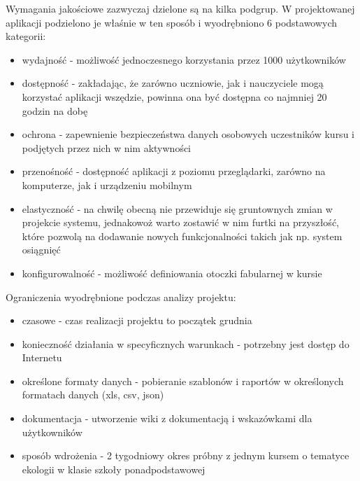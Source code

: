 Wymagania jakościowe zazwyczaj dzielone są na kilka podgrup. W projektowanej aplikacji podzielono je właśnie w ten sposób i wyodrębniono 6 podstawowych kategorii:
\begin{itemize}
\item wydajność - możliwość jednoczesnego korzystania przez 1000 użytkowników
\item dostępność - zakładając, że zarówno uczniowie, jak i nauczyciele mogą korzystać aplikacji wszędzie, powinna ona być dostępna co najmniej 20 godzin na dobę
\item ochrona - zapewnienie bezpieczeństwa danych osobowych uczestników kursu i podjętych przez nich w nim aktywności 
\item przenośność - dostępność aplikacji z poziomu przeglądarki, zarówno na komputerze, jak i urządzeniu mobilnym
\item elastyczność - na chwilę obecną nie przewiduje się gruntownych zmian w projekcie systemu, jednakowoż warto zostawić w nim furtki na przyszłość, które pozwolą na dodawanie nowych funkcjonalności takich jak np. system osiągnięć 
\item konfigurowalność - możliwość definiowania otoczki fabularnej w kursie
\end{itemize} 
\vspace{0.3cm}
Ograniczenia wyodrębnione podczas analizy projektu:
\begin{itemize}
\item czasowe - czas realizacji projektu to początek grudnia
\item konieczność działania w specyficznych warunkach - potrzebny jest dostęp do Internetu
\item określone formaty danych - pobieranie szablonów i raportów w określonych formatach danych (xls, csv, json)
\item dokumentacja - utworzenie wiki z dokumentacją i wskazówkami dla użytkowników
\item sposób wdrożenia - 2 tygodniowy okres próbny z jednym kursem o tematyce ekologii w klasie szkoły ponadpodstawowej
\end{itemize}
